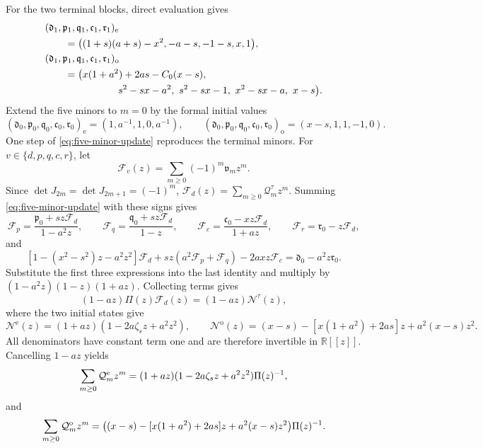 \documentclass[preprints,article,accept,oneauthor]{Definitions/mdpi}
\numberwithin{equation}{section}
\theoremstyle{mdpi}
\theoremstyle{definition}
\begin{document}
For the two terminal blocks, direct evaluation gives
\[
\begin{aligned}
&(\mathfrak d_1,\mathfrak p_1,\mathfrak q_1,\mathfrak c_1,\mathfrak r_1)_{\mathrm e}\\
&\qquad=\bigl((1+s)(a+s)-x^2,-a-s,-1-s,x,1\bigr),\\
&(\mathfrak d_1,\mathfrak p_1,\mathfrak q_1,\mathfrak c_1,\mathfrak r_1)_{\mathrm o}\\
&\qquad=\bigl(x(1+a^2)+2as-C_0(x-s),\\
&\hspace{26mm}s^2-sx-a^2,\ s^2-sx-1,\ x^2-sx-a,\ x-s\bigr).
\end{aligned}
\]
Extend the five minors to \(m=0\) by the formal initial values
\[
 (\mathfrak d_0,\mathfrak p_0,\mathfrak q_0,\mathfrak c_0,\mathfrak r_0)_{\mathrm e}
 =(1,a^{-1},1,0,a^{-1}),
 \qquad
 (\mathfrak d_0,\mathfrak p_0,\mathfrak q_0,\mathfrak c_0,\mathfrak r_0)_{\mathrm o}
 =(x-s,1,1,-1,0).
\]
One step of \eqref{eq:five-minor-update} reproduces the terminal minors.
For \(v\in\{d,p,q,c,r\}\), let
\[
 \mathcal F_v(z)=\sum_{m\geq0}(-1)^m\mathfrak v_mz^m.
\]
Since \(\det J_{2m}=\det J_{2m+1}=(-1)^m\),
\(\mathcal F_d(z)=\sum_{m\geq0}\mathcal Q_m^\tau z^m\).
Summing \eqref{eq:five-minor-update} with these signs gives
\[
 \mathcal F_p=\frac{\mathfrak p_0+sz\mathcal F_d}{1-a^2z},\qquad
 \mathcal F_q=\frac{\mathfrak q_0+sz\mathcal F_d}{1-z},\qquad
 \mathcal F_c=\frac{\mathfrak c_0-xz\mathcal F_d}{1+az},\qquad
 \mathcal F_r=\mathfrak r_0-z\mathcal F_d,
\]
and
\[
 [1-(x^2-s^2)z-a^2z^2]\mathcal F_d
 +sz(a^2\mathcal F_p+\mathcal F_q)-2axz\mathcal F_c
 =\mathfrak d_0-a^2z\mathfrak r_0.
\]
Substitute the first three expressions into the last identity and multiply
by \((1-a^2z)(1-z)(1+az)\).  Collecting terms gives
\[
 (1-az)\Pi(z)\mathcal F_d(z)=(1-az)\mathcal N^\tau(z),
\]
where the two initial states give
\[
 \mathcal N^{\mathrm e}(z)=(1+az)(1-2a\zeta_sz+a^2z^2),\qquad
 \mathcal N^{\mathrm o}(z)=(x-s)-[x(1+a^2)+2as]z+a^2(x-s)z^2.
\]
All denominators have constant term one and are therefore invertible in
\(\mathbb R[[z]]\).  Cancelling \(1-az\) yields
\begin{equation}\label{eq:fold-generating-even}
 \sum_{m\geq0}\mathcal Q_m^{\rm e}z^m
 =(1+az)(1-2a\zeta_sz+a^2z^2)\Pi(z)^{-1},
\end{equation}
and
\begin{equation}\label{eq:fold-generating-odd}
 \sum_{m\geq0}\mathcal Q_m^{\rm o}z^m
 =\bigl((x-s)-[x(1+a^2)+2as]z+a^2(x-s)z^2\bigr)
  \Pi(z)^{-1}.
\end{equation}
\end{document}
